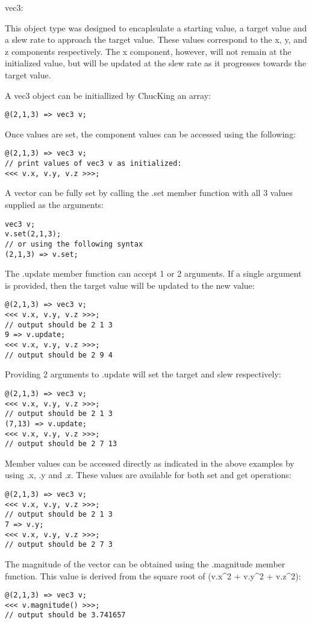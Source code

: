 vec3:

This object type was designed to encaplsulate a starting value, a target value
and a slew rate to approach the target value.  These values correspond to the x,
y, and z components respectively.  The x component, however, will not remain at
the initialized value, but will be updated at the slew rate as it progresses
towards the target value.

A vec3 object can be initiallized by ChucKing an array:
\begin{verbatim}
@(2,1,3) => vec3 v;
\end{verbatim}

Once values are set, the component values can be accessed using the following:
\begin{verbatim}
@(2,1,3) => vec3 v;
// print values of vec3 v as initialized:
<<< v.x, v.y, v.z >>>;
\end{verbatim}

A vector can be fully set by calling the .set member function with all 3 values
supplied as the arguments:
\begin{verbatim}
vec3 v;
v.set(2,1,3);
// or using the following syntax
(2,1,3) => v.set;
\end{verbatim}

The .update member function can accept 1 or 2 arguments.  If a single argument
is provided, then the target value will be updated to the new value:
\begin{verbatim}
@(2,1,3) => vec3 v;
<<< v.x, v.y, v.z >>>;
// output should be 2 1 3
9 => v.update;
<<< v.x, v.y, v.z >>>;
// output should be 2 9 4
\end{verbatim}

Providing 2 arguments to .update will set the target and slew respectively:
\begin{verbatim}
@(2,1,3) => vec3 v;
<<< v.x, v.y, v.z >>>;
// output should be 2 1 3
(7,13) => v.update;
<<< v.x, v.y, v.z >>>;
// output should be 2 7 13
\end{verbatim}

Member values can be accessed directly as indicated in the above examples by
using .x, .y and .z.  These values are available for both set and get operations:
\begin{verbatim}
@(2,1,3) => vec3 v;
<<< v.x, v.y, v.z >>>;
// output should be 2 1 3
7 => v.y;
<<< v.x, v.y, v.z >>>;
// output should be 2 7 3
\end{verbatim}

The magnitude of the vector can be obtained using the .magnitude member function.
This value is derived from the square root of (v.x^2 + v.y^2 + v.z^2):
\begin{verbatim}
@(2,1,3) => vec3 v;
<<< v.magnitude() >>>;
// output should be 3.741657
\end{verbatim}

